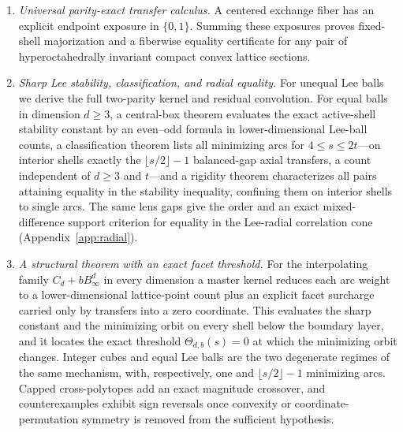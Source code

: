 \documentclass[pdflatex,sn-mathphys-num]{sn-jnl}
\theoremstyle{thmstyleone}
\theoremstyle{thmstylethree}
\theoremstyle{thmstyletwo}
\begin{document}
\begin{enumerate}[leftmargin=2em]
  \item \emph{Universal parity-exact transfer calculus.}  A centered
  exchange fiber has an explicit endpoint exposure in $\{0,1\}$.  Summing
  these exposures proves fixed-shell majorization and a fiberwise equality
  certificate for any pair of hyperoctahedrally invariant compact convex
  lattice sections.

  \item \emph{Sharp Lee stability, classification, and radial equality.}
  For unequal Lee balls we derive the full two-parity kernel and residual
  convolution.  For equal balls in dimension $d\ge3$, a central-box theorem
  evaluates the exact active-shell stability constant by an even--odd
  formula in lower-dimensional Lee-ball counts, a classification theorem
  lists all minimizing arcs for $4\le s\le2t$---on interior shells exactly
  the $\lfloor s/2\rfloor-1$ balanced-gap axial transfers, a count
  independent of $d\ge3$ and $t$---and a rigidity theorem characterizes all
  pairs attaining equality in the stability inequality, confining them on
  interior shells to single arcs.  The same lens gaps give the order and an
  exact mixed-difference support criterion for equality in the Lee-radial
  correlation cone (Appendix~\ref{app:radial}).

  \item \emph{A structural theorem with an exact facet threshold.}  For the
  interpolating family $C_d+bB_\infty^d$ in every dimension a master kernel
  reduces each arc weight to a lower-dimensional lattice-point count plus an
  explicit facet surcharge carried only by transfers into a zero coordinate.
  This evaluates the sharp constant and the minimizing orbit on every shell
  below the boundary layer, and it locates the exact threshold
  $\Theta_{d,b}(s)=0$ at which the minimizing orbit changes.  Integer cubes
  and equal Lee balls are the two degenerate regimes of the same mechanism,
  with, respectively, one and $\lfloor s/2\rfloor-1$ minimizing arcs.
  Capped cross-polytopes add an exact magnitude crossover, and
  counterexamples exhibit sign reversals once convexity or
  coordinate-permutation symmetry is removed from the sufficient hypothesis.

\end{enumerate}
\end{document}
